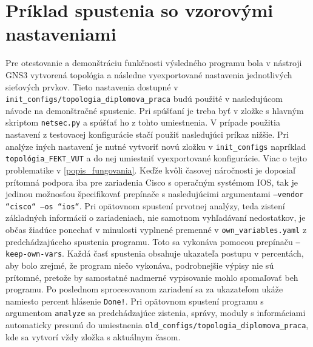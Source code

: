 \section{Príklad spustenia so vzorovými nastaveniami}
Pre otestovanie a demonštráciu funkčnosti výsledného programu bola v nástroji GNS3 vytvorená topológia a následne vyexportované nastavenia jednotlivých sieťových prvkov. Tieto nastavenia dostupné v \texttt{init\_configs/topologia\_diplomova\_praca} budú použité v nasledujúcom návode na demonštračné spustenie. Pri spúšťaní je treba byť v zložke s hlavným skriptom \texttt{netsec.py} a spúšťať ho z tohto umiestnenia. V prípade použitia nastavení z testovacej konfigurácie stačí použiť nasledujúci príkaz nižšie. Pri analýze iných nastavení je nutné vytvoriť novú zložku v \texttt{init\_configs} napríklad \texttt{topológia\_FEKT\_VUT} a do nej umiestniť vyexportované konfigurácie. Viac o tejto problematike v \ref{popis_fungovania}. Keďže kvôli časovej náročnosti je doposiaľ prítomná podpora iba pre zariadenia Cisco s operačným systémom IOS, tak je jedinou možnosťou špecifikovať prepínače s nasledujúcimi argumentami \texttt{---vendor ``cisco`` ---os ``ios``}. Pri opätovnom spustení prvotnej analýzy, teda zistení základných informácií o zariadeniach, nie samotnom vyhľadávaní nedostatkov, je občas žiadúce ponechať v minulosti vyplnené premenné v \texttt{own\_variables.yaml} z predchádzajúceho spustenia programu. Toto sa vykonáva pomocou prepínaču \texttt{---keep-own-vars}. Každá časť spustenia obsahuje ukazateľa postupu v percentách, aby bolo zrejmé, že program niečo vykonáva, podrobnejšie výpisy nie sú prítomné, pretože by samostatné nadmerné vypisovanie mohlo spomaľovať beh programu. Po poslednom sprocesovanom zariadení sa za ukazateľom ukáže namiesto percent hlásenie \texttt{Done!}. Pri opätovnom spustení programu s argumentom \texttt{analyze} sa predchádzajúce zistenia, správy, moduly s informáciami automaticky presunú do umiestnenia \texttt{old\_configs/topologia\_diplomova\_praca}, kde sa vytvorí vždy zložka s aktuálnym časom.

